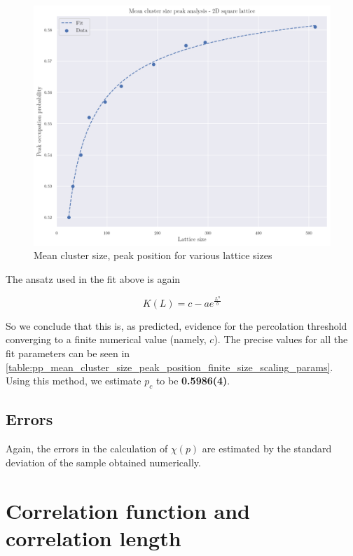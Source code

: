 \begin{figure}[H]
  \includegraphics[width=\linewidth]{Images/sim_mean_cluster_size_peak_position.png}
  \caption{Mean cluster size, peak position for various lattice sizes}
  \label{fig:sim_mean_cluster_size_peak_position}
\end{figure}


The ansatz used in the fit above is again

$$ 
    K(L) = c - a e^{\frac{L^n}{b}}
$$

So we conclude that this is, as predicted, evidence for the percolation threshold converging to a finite numerical value (namely, $c$). The precise values for all the fit parameters can be seen in \autoref{table:pp_mean_cluster_size_peak_position_finite_size_scaling_params}. Using this method, we estimate $p_c$ to be \textbf{0.5986(4)}. 

\subsection{Errors}

Again, the errors in the calculation of $\chi(p)$ are estimated by the standard deviation of the sample obtained numerically.

\section{Correlation function and correlation length}




